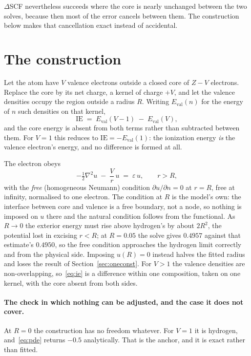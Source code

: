 \documentclass[11pt]{article}
\begin{document}
$\Delta$SCF nevertheless succeeds where the core is nearly unchanged between the two solves,
because then most of the error cancels between them. The construction below makes that
cancellation exact instead of accidental.

\section{The construction}\label{sec:constr}

Let the atom have $V$ valence electrons outside a closed core of $Z-V$ electrons. Replace
the core by its net charge, a kernel of charge $+V$, and let the valence densities occupy the
region outside a radius $R$. Writing $E_{\mathrm{val}}(n)$ for the energy of $n$ such
densities on that kernel,
\begin{equation}
\mathrm{IE} \;=\; E_{\mathrm{val}}(V-1) \;-\; E_{\mathrm{val}}(V),
\label{eq:ie}
\end{equation}
and the core energy is absent from both terms rather than subtracted between them. For
$V=1$ this reduces to $\mathrm{IE} = -E_{\mathrm{val}}(1)$: the ionization energy
\emph{is} the valence electron's energy, and no difference is formed at all.

The electron obeys
\begin{equation}
-\tfrac12\nabla^2 u \;-\; \frac{V}{r}\,u \;=\; \varepsilon\,u, \qquad r>R,
\label{eq:pde}
\end{equation}
with the \emph{free} (homogeneous Neumann) condition $\partial u/\partial n=0$ at $r=R$, free
at infinity, normalised to one electron. The condition at $R$ is the model's own: the interface
between core and valence is a free boundary, not a node, so nothing is imposed on $u$ there and
the natural condition follows from the functional. As $R\to0$ the exterior energy must rise
above hydrogen's by about $2R^2$, the potential lost in excising $r<R$; at $R=0.05$ the solve
gives $0.4957$ against that estimate's $0.4950$, so the free condition approaches the hydrogen
limit correctly and from the physical side. Imposing $u(R)=0$ instead halves the fitted radius
and loses the result of Section~\ref{sec:oneconst}. For $V>1$ the
valence densities are non-overlapping, so~\eqref{eq:ie} is a difference within one
composition, taken on one kernel, with the core absent from both sides.

\paragraph{The check in which nothing can be adjusted, and the case it does not cover.} At
$R=0$ the construction has no freedom whatever. For $V=1$ it is hydrogen, and~\eqref{eq:pde}
returns $-0.5$ analytically. That is the anchor, and it is exact rather than fitted.
\end{document}
